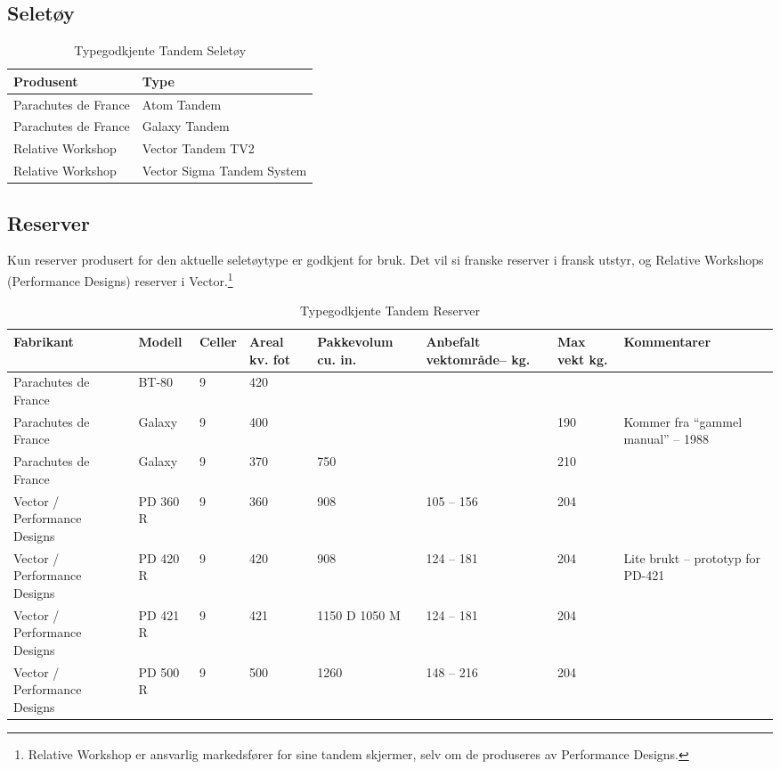 \subsection{Seletøy}
\begin{table}
	\caption{Typegodkjente Tandem Seletøy}
	\begin{tabular}{ | l | l |  }
		\hline
		Produsent & Type \\
		\hline
		Parachutes de France & Atom Tandem \\
		\hline
		Parachutes de France & Galaxy Tandem \\
		\hline
		Relative Workshop & Vector Tandem TV2 \\
		\hline
		Relative Workshop & Vector Sigma Tandem System \\
		\hline
	\end{tabular}
\end{table}

\subsection{Reserver}
Kun reserver produsert for den aktuelle seletøytype er godkjent for bruk. Det vil si franske reserver i fransk utstyr, og Relative Workshops (Performance Designs) reserver i Vector.\footnote{Relative Workshop er ansvarlig markedsfører for sine tandem skjermer, selv om de produseres av Performance Designs.}

\begin{table}
	\caption{Typegodkjente Tandem Reserver}
	\begin{tabular}{ | p{2cm} | p{1cm} | p{1cm} | p{1cm} | p{1cm} | p{1cm} | p{1cm} | p{2cm} | }
		\hline
		Fabrikant & Modell & Celler & Areal kv. fot & Pakkevolum cu. in. & Anbefalt vektområde– kg. & Max vekt kg. & Kommentarer \\
		\hline
		Parachutes de France & BT-80 & 9 & 420 & & & & \\
		\hline
		Parachutes de France & Galaxy & 9 & 400 & & & 190 & Kommer fra ``gammel manual'' – 1988 \\
		\hline
		Parachutes de France & Galaxy & 9 & 370 & 750 & & 210 & \\
		\hline
		Vector / Performance Designs & PD 360 R & 9 & 360 & 908 & 105 – 156 & 204\footnotemark & \\
		\hline
		Vector / Performance Designs & PD 420 R & 9 & 420 & 908 & 124 – 181 & 204 & Lite brukt – prototyp for PD-421 \\
		\hline
		Vector / Performance Designs & PD 421 R & 9 & 421 & 1150 D 1050 M\footnotemark & 124 – 181 & 204 & \\
		\hline
		Vector / Performance Designs & PD 500 R & 9 & 500 & 1260 & 148 – 216 & 204 & \\
		\hline
	\end{tabular}
\end{table}

